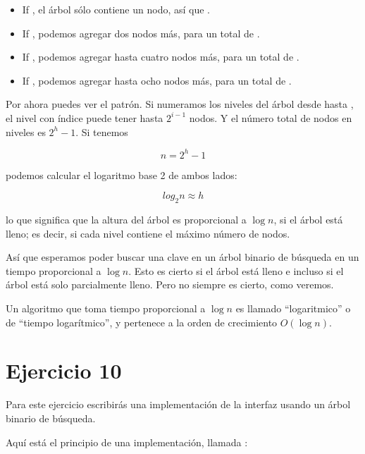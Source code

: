 \documentclass[12pt]{book}
\theoremstyle{exercise}
\begin{document}
\begin{itemize}

\item
  If , el árbol sólo contiene un nodo, así que .

\item
  If , podemos agregar dos nodos más, para un total de
  .

\item
  If , podemos agregar hasta cuatro nodos más, para un total
  de .

\item
  If , podemos agregar hasta ocho nodos más, para un total
  de .

\end{itemize}

Por ahora puedes ver el patrón. Si numeramos los niveles del árbol desde
 hasta , el nivel con índice  puede tener hasta
$2^{i-1}$ nodos. Y el número total de nodos en  niveles es $2^h-1$.
Si tenemos

\[ n = 2^h - 1 \]

podemos calcular el logaritmo base 2 de ambos lados:

\[ log_2 n \approx h \]

lo que significa que la altura del árbol es proporcional a
$\log n$, si el árbol está lleno; es decir, si cada nivel contiene el
máximo número de nodos.

Así que esperamos poder buscar una clave en un árbol binario de búsqueda
en un tiempo proporcional a $\log n$. Esto es cierto si el árbol está lleno e
incluso si el árbol está solo parcialmente lleno. Pero no siempre es cierto,
como veremos.


Un algoritmo que toma tiempo proporcional a $\log n$ es llamado
``logaritmico'' o de ``tiempo logarítmico'', y pertenece a la orden de crecimiento
$O(\log n)$.


\section{Ejercicio 10}
\label{exercise10}

Para este ejercicio escribirás una implementación de la
interfaz  usando un árbol binario de búsqueda.


Aquí está el principio de una implementación, llamada :
\end{document}

